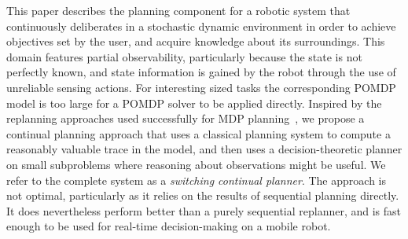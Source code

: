 
This paper describes the planning component for a robotic system that
continuously deliberates in a stochastic dynamic environment in order
to achieve objectives set by the user, and acquire knowledge about its
surroundings. This domain features partial observability, particularly
because the state is not perfectly known, and state information is
gained by the robot through the use of unreliable sensing
actions. 
For
interesting sized tasks the corresponding POMDP model is too large for a
POMDP solver to be applied directly. Inspired by the replanning
approaches used successfully for MDP
planning~\cite{yoon:etal:2007,yoon:etal:2008}, we propose a continual
planning approach that uses a classical planning system to compute a
reasonably valuable trace in the model, and then uses a
decision-theoretic planner on small subproblems where reasoning about
observations might be useful. We refer to the complete system as a
{\em switching continual planner}. The approach is not optimal,
particularly as it relies on the results of sequential planning
directly. It does nevertheless perform better than a purely sequential
replanner, and is fast enough to be used for real-time decision-making
on a mobile robot.





